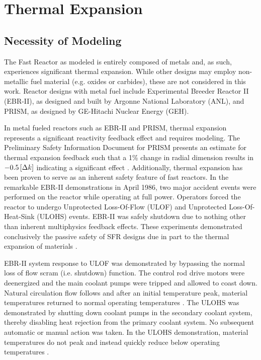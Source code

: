 \chapter{Thermal Expansion}
\label{ch:thermalExpansion}

\section{Necessity of Modeling}
  The Fast Reactor as modeled is entirely composed of
  metals and, as such, experiences significant thermal expansion. While other 
  designs may employ non-metallic fuel material (e.g. oxides or carbides), these 
  are not considered in this work. Reactor designs with metal fuel include 
  Experimental Breeder Reactor II (EBR-II), as designed and built by Argonne 
  National Laboratory (ANL), and PRISM, as designed by GE-Hitachi Nuclear Energy 
  (GEH).

  In metal fueled reactors such as EBR-II and PRISM, thermal expansion 
  represents a significant reactivity feedback effect and requires modeling. 
  The Preliminary Safety Information Document for PRISM presents an 
  estimate for thermal expansion feedback such that a 1\% change in radial 
  dimension results in $-0.5 \left[\text{{$\Delta k$}}\right]$ indicating a significant effect 
  \cite{GEFR793}. Additionally, thermal expansion has been proven to serve as an 
  inherent safety feature of fast reactors. In the remarkable EBR-II 
  demonstrations in April 1986, two major accident events were performed on the 
  reactor while operating at full power. Operators forced the reactor to undergo 
  Unprotected Loss-Of-Flow (ULOF) and Unprotected Loss-Of-Heat-Sink (ULOHS) 
  events. EBR-II was safely shutdown due to nothing other than inherent
  multiphysics feedback effects. These experiments demonstrated conclusively the 
  passive safety of SFR designs due in part to the thermal expansion of 
  materials \cite{PlentifulEnergy}.

  EBR-II system response to ULOF was demonstrated by bypassing the normal loss 
  of flow scram (i.e. shutdown) function. The control rod drive motors were 
  deenergized and the main coolant pumps were tripped and allowed to coast down. 
  Natural circulation flow follows and after an initial temperature peak, 
  material temperatures returned to normal operating temperatures 
  \cite{ebriitests}. The ULOHS was demonstrated by shutting down coolant pumps 
  in the secondary coolant system, thereby disabling heat rejection from the 
  primary coolant system. No subsequent automatic or manual action was taken. In 
  the ULOHS demonstration, material temperatures do not peak and instead quickly 
  reduce below operating temperatures \cite{ebriitests}.


